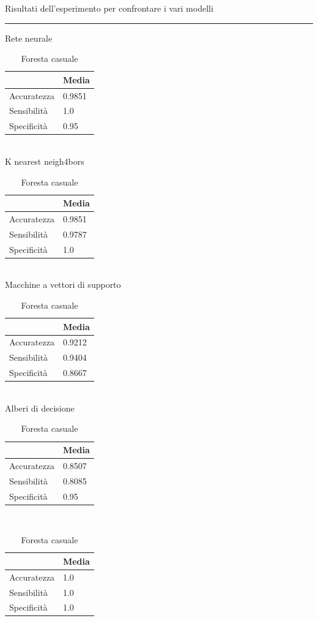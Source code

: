 \documentclass[a4paper,12pt]{report}
\begin{document}
\begin{table}
\caption{Risultati dell'esperimento per confrontare i vari modelli}
\rule{\textwidth}{0.25mm}

\caption{Rete neurale}
\begin{tabular}{|l|l|}
\hline
			& Media     \\ \hline
Accuratezza & 0.9851    \\ \hline
Sensibilità &    1.0    \\ \hline
Specificità &   0.95    \\ \hline
\end{tabular}
\\

\caption{K nearest neigh4bors}
\begin{tabular}{|l|l|}
\hline
			& Media     \\ \hline
Accuratezza & 0.9851    \\ \hline
Sensibilità & 0.9787    \\ \hline
Specificità &    1.0    \\ \hline
\end{tabular}
\\


\caption{Macchine a vettori di supporto}
\begin{tabular}{|l|l|}
\hline
			& Media     \\ \hline
Accuratezza & 0.9212	\\ \hline
Sensibilità & 0.9404	\\ \hline
Specificità & 0.8667	\\ \hline
\end{tabular}
\\


\caption{Alberi di decisione}
\begin{tabular}{|l|l|}
\hline
			& Media     \\ \hline
Accuratezza & 0.8507    \\ \hline
Sensibilità & 0.8085    \\ \hline
Specificità &   0.95    \\ \hline
\end{tabular}
\\


\caption{Foresta casuale}
\begin{tabular}{|l|l|}
\hline
			& Media   	\\ \hline
Accuratezza & 1.0    	\\ \hline
Sensibilità & 1.0    	\\ \hline
Specificità & 1.0    	\\ \hline
\end{tabular}
\\



\end{table}
\end{document}
